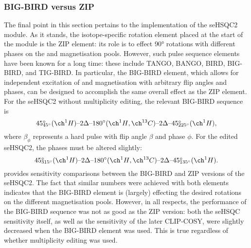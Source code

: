 \subsubsection{BIG-BIRD versus ZIP}

The final point in this section pertains to the implementation of the seHSQC2 module.
As it stands, the isotope-specific rotation element placed at the start of the module is the ZIP element: its role is to effect \ang{90} rotations with different phases on the  and  magnetisation pools.
However, such pulse sequence elements have been known for a long time: these include TANGO\autocite{Wimperis1984JMR}, BANGO\autocite{Sorensen1994BMR}, BIRD\autocite{Garbow1982CPL,Uhrin1993JMRSA,Kaltschnee2014CC}, BIG-BIRD\autocite{Briand1997JMR}, and TIG-BIRD\autocite{Briand1998JMR}.
In particular, the BIG-BIRD element, which allows for independent excitation of  and  magnetisation with arbitrary flip angles and phases, can be designed to accomplish the same overall effect as the ZIP element.
For the seHSQC2 without multiplicity editing, the relevant BIG-BIRD sequence is
\begin{equation}
    \label{eq:big_bird_unedited}
    45\rlap{\unit{\degree}}_{\ang{45}}(\proton{})\text{--}2\Delta\text{--}\ang{180}(\proton{},\carbon{})\text{--}2\Delta\text{--}45\rlap{\unit{\degree}}_{\ang{225}}(\proton{}),
\end{equation}
where $\beta_\phi$ represents a hard pulse with flip angle $\beta$ and phase $\phi$.
For the edited seHSQC2, the phases must be altered slightly:
\begin{equation}
    \label{eq:big_bird_edited}
    45\rlap{\unit{\degree}}_{\ang{315}}(\proton{})\text{--}2\Delta\text{--}\ang{180}(\proton{},\carbon{})\text{--}2\Delta\text{--}45\rlap{\unit{\degree}}_{\ang{135}}(\proton{}).
\end{equation}
 provides sensitivity comparisons between the BIG-BIRD and ZIP versions of the seHSQC2.
The fact that similar numbers were achieved with both elements indicates that the BIG-BIRD element is (largely) effecting the desired rotations on the different magnetisation pools.
However, in all respects, the performance of the BIG-BIRD sequence was not as good as the ZIP version: both the seHSQC sensitivity itself, as well as the sensitivity of the later CLIP-COSY, were slightly decreased when the BIG-BIRD element was used.
This is true regardless of whether multiplicity editing was used.

